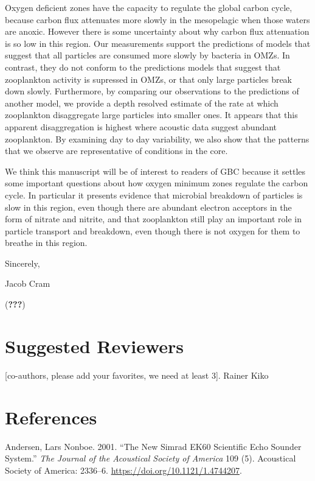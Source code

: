 \documentclass[]{article}
\begin{document}
Oxygen deficient zones have the capacity to regulate the global carbon
cycle, because carbon flux attenuates more slowly in the mesopelagic
when those waters are anoxic. However there is some uncertainty about
why carbon flux attenuation is so low in this region. Our measurements
support the predictions of models that suggest that all particles are
consumed more slowly by bacteria in OMZs. In contrast, they do not
conform to the predictions models that suggest that zooplankton activity
is supressed in OMZs, or that only large particles break down slowly.
Furthermore, by comparing our observations to the predictions of another
model, we provide a depth resolved estimate of the rate at which
zooplankton disaggregate large particles into smaller ones. It appears
that this apparent disaggregation is highest where acoustic data suggest
abundant zooplankton. By examining day to day variability, we also show
that the patterns that we observe are representative of conditions in
the core.

We think this manuscript will be of interest to readers of GBC because
it settles some important questions about how oxygen minimum zones
regulate the carbon cycle. In particular it presents evidence that
microbial breakdown of particles is slow in this region, even though
there are abundant electron acceptors in the form of nitrate and
nitrite, and that zooplankton still play an important role in particle
transport and breakdown, even though there is not oxygen for them to
breathe in this region.

Sincerely,

Jacob Cram

({\textbf{???}})

\hypertarget{suggested-reviewers}{%
\section{Suggested Reviewers}\label{suggested-reviewers}}

{[}co-authors, please add your favorites, we need at least 3{]}. Rainer
Kiko

\hypertarget{references}{%
\section*{References}\label{references}}

\hypertarget{refs}{}
\leavevmode\hypertarget{ref-andersenNewSimradEK602001}{}%
Andersen, Lars Nonboe. 2001. ``The New Simrad EK60 Scientific Echo
Sounder System.'' \emph{The Journal of the Acoustical Society of
America} 109 (5). Acoustical Society of America: 2336--6.
\url{https://doi.org/10.1121/1.4744207}.
\end{document}
